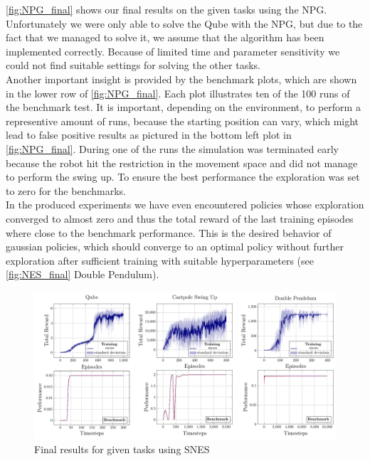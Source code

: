 \autoref{fig:NPG_final} shows our final results on the given tasks using the NPG. Unfortunately we were only able to solve the Qube with the NPG, but due to the fact that we managed to solve it, we assume that the algorithm has been implemented correctly. Because of limited time and parameter sensitivity we could not find suitable settings for solving the other tasks. \\
Another important insight is provided by the benchmark plots, which are shown in the lower row of \autoref{fig:NPG_final}. Each plot illustrates ten of the 100 runs of the benchmark test. It is important, depending on the environment, to perform a representive amount of runs, because the starting position can vary, which might lead to false positive results as pictured in the bottom left plot in \autoref{fig:NPG_final}. During one of the runs the simulation was terminated early because the robot hit the restriction in the movement space and did not manage to perform the swing up. To ensure the best performance the exploration was set to zero for the benchmarks. \\
In the produced experiments we have even encountered policies whose exploration converged to almost zero and thus the total reward of the last training episodes where close to the benchmark performance. This is the desired behavior of gaussian policies, which should converge to an optimal policy without further exploration after sufficient training with suitable hyperparameters (see \autoref{fig:NES_final} Double Pendulum). \\

\begin{figure}
\centering
\includegraphics[width=\textwidth]{plots/learned_benchmarked_NES.pdf}
\caption{Final results for given tasks using SNES}
\label{fig:NES_final}
\end{figure}

